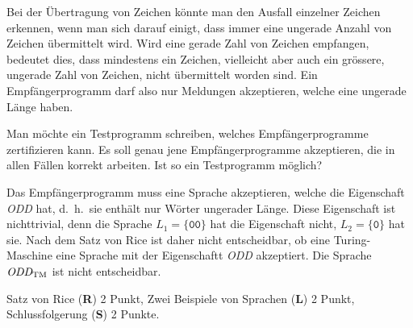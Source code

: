 Bei der Übertragung von Zeichen könnte man den Ausfall einzelner
Zeichen erkennen, wenn man sich darauf einigt, dass immer eine ungerade
Anzahl von Zeichen übermittelt wird.
Wird eine gerade Zahl von Zeichen empfangen, bedeutet dies, dass mindestens
ein Zeichen, vielleicht aber auch ein grössere, ungerade Zahl von Zeichen,
nicht übermittelt worden sind.
Ein Empfängerprogramm darf also nur Meldungen akzeptieren, welche eine
ungerade Länge haben.

Man möchte ein Testprogramm schreiben, welches Empfängerprogramme
zertifizieren kann.
Es soll genau jene Empfängerprogramme akzeptieren, die in allen Fällen
korrekt arbeiten.
Ist so ein Testprogramm möglich?


\begin{loesung}
Das Empfängerprogramm muss eine Sprache akzeptieren, welche die Eigenschaft
{\em ODD} hat, d.~h.~sie enthält nur Wörter ungerader Länge.
Diese Eigenschaft ist nichttrivial, denn die Sprache $L_1=\{\texttt{00}\}$
hat die Eigenschaft nicht, $L_2=\{\texttt{0}\}$ hat sie.
Nach dem Satz von Rice ist daher nicht entscheidbar, ob eine Turing-Maschine
eine Sprache mit der Eigenschaftt {\em ODD} akzeptiert.
Die Sprache $\text{\em ODD}_{\text{TM}}$ ist nicht entscheidbar.
\end{loesung}

\begin{bewertung}
Satz von Rice ({\bf R}) 2 Punkt,
Zwei Beispiele von Sprachen ({\bf L}) 2 Punkt,
Schlussfolgerung ({\bf S}) 2 Punkte.
\end{bewertung}

